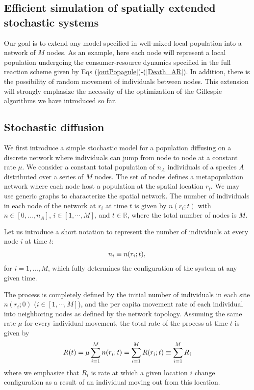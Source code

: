 \subsection{Efficient simulation of spatially extended stochastic systems}
\label{space}
Our goal is to extend any model specified in well-mixed local population into a network of $M$ nodes. As an example, here each node will represent a local population undergoing the consumer-resource dynamics specified in the full reaction scheme given by Eqs (\ref{outPopagule})-(\ref{Death_AR}). In addition, there is the possibility of random movement of individuals between nodes. This extension will strongly emphasize the necessity of the optimization of the Gillespie algorithms we have introduced so far.   
\smallskip
   
\subsection*{{\bfseries Stochastic diffusion}}   
 We first introduce a simple stochastic model for a population diffusing on a discrete network where individuals can jump from node to node at a constant rate $\mu$. We consider a constant total population of $n_A$ individuals of a species $A$ distributed over a series of $M$ nodes. The set of nodes defines a metapopulation network where each node host a population at the spatial location $r_i$. We may use generic graphs to characterize the spatial network. The number of individuals in each node of the network at $r_i$ at time $t$ is given by $n(r_i;t)$ with $n \in [0, \dots, n_A]$, $i \in [1,\cdots,M]$, and $t \in \mathbb{R}$, where the total number of nodes is $M$.
\smallskip

Let us introduce a short notation to represent the number of individuals at every node $i$ at time $t$:
\begin{equation}
n_i \equiv n(r_i;t), \\
\label{eq:R_M}
\end{equation}
for $i=1, \dots, M$, which fully determines the configuration of the system at any given time. 
\smallskip

The process is completely defined by the initial number of individuals in each site $n(r_i;0)$ ($i \in [1,\cdots,M]$), and the per capita movement rate of each individual into neighboring nodes as defined by the network topology. Assuming the same rate $\mu$ for every individual movement, the total rate of the process at time $t$ is given by
\begin{equation}
R(t) =  \mu \sum_{i=1}^{M}n(r_i;t) = \sum_{i=1}^{M} R(r_i;t) \equiv \sum_{i=1}^{M} R_i\\
\label{eq:R_M}
\end{equation}
where we emphasize that $R_i$ is rate at which a given location $i$ change configuration as a result of an individual moving out from this location.  
\smallskip

